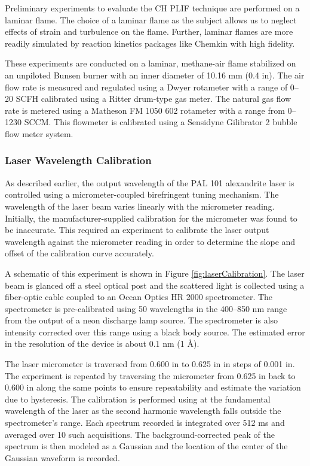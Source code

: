 Preliminary experiments to evaluate the CH PLIF technique are performed on a laminar flame.
The choice of a laminar flame as the subject allows us to neglect effects of strain and turbulence on the flame.
Further, laminar flames are more readily simulated by reaction kinetics packages like Chemkin with high fidelity.

These experiments are conducted on a laminar, methane-air flame stabilized on an unpiloted Bunsen burner with an inner diameter of 10.16 mm (0.4 in).
The air flow rate is measured and regulated using a Dwyer rotameter with a range of 0--20 SCFH calibrated using a Ritter drum-type gas meter.
The natural gas flow rate is metered using a Matheson FM 1050 602 rotameter with a range from 0--1230 SCCM.
This flowmeter is calibrated using a Sensidyne Gilibrator 2 bubble flow meter system.

\subsubsection{Laser Wavelength Calibration}
\label{subsubsec:plif-laser-wavelength-calibration}



As described earlier, the output wavelength of the PAL 101 alexandrite laser is controlled using a micrometer-coupled birefringent tuning mechanism.
The wavelength of the laser beam varies linearly with the micrometer reading.
Initially, the manufacturer-supplied calibration for the micrometer was found to be inaccurate.
This required an experiment to calibrate the laser output wavelength against the micrometer reading in order to determine the slope and offset of the calibration curve accurately.

A schematic of this experiment is shown in Figure \ref{fig:laserCalibration}.
The laser beam is glanced off a steel optical post and the scattered light is collected using a fiber-optic cable coupled to an Ocean Optics HR 2000 spectrometer.
The spectrometer is pre-calibrated using 50 wavelengths in the 400--850 nm range from the output of a neon discharge lamp source.
The spectrometer is also intensity corrected over this range using a black body source.
The estimated error in the resolution of the device is about 0.1 nm (1 \AA).

The laser micrometer is traversed from 0.600 in to 0.625 in in steps of 0.001 in.
The experiment is repeated by traversing the micrometer from 0.625 in back to 0.600 in along the same points to ensure repeatability and estimate the variation due to hysteresis.
The calibration is performed using at the fundamental wavelength of the laser as the second harmonic wavelength falls outside the spectrometer's range.
Each spectrum recorded is integrated over 512 ms and averaged over 10 such acquisitions.
The background-corrected peak of the spectrum is then modeled as a Gaussian and the location of the center of the Gaussian waveform is recorded.

